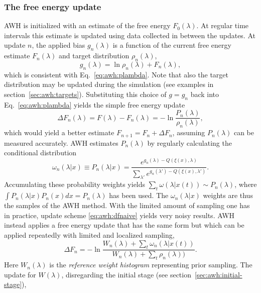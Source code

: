 \subsubsection{The free energy update}
AWH is initialized with an estimate of the free energy $F_0(\lambda)$.
At regular time intervals this estimate is updated using data collected in between the updates.
At update $n$, the applied bias $g_n(\lambda)$ is a function of the current free energy estimate $F_n(\lambda)$
and target distribution $\rho_n(\lambda)$,
\begin{equation}\label{eq:awh:grhofrelation}
g_n(\lambda) = \ln \rho_n(\lambda) +F_n(\lambda),
\end{equation}
which is consistent with Eq.~\ref{eq:awh:plambda}.
Note that also the target distribution may be updated during the simulation (see examples in section~\ref{sec:awh:targets}).
Substituting this choice of $g=g_n$ back into Eq.~\ref{eq:awh:plambda} yields the simple free energy update
\begin{equation}\label{eq:awh:dfnaive}
\Delta F_n(\lambda) 
= F(\lambda) - F_n(\lambda) 
= -\ln\frac{P_n(\lambda)}{\rho_n(\lambda)},
\end{equation}
which would yield a better estimate $F_{n+1} = F_n + \Delta F_n$, assuming $P_n(\lambda)$ can be measured accurately.
AWH estimates $P_n(\lambda)$ by regularly calculating the conditional distribution
\begin{equation}\label{eq:awh:omega}
\omega_n(\lambda|x) \equiv P_n(\lambda|x) = \frac{e^{g_n(\lambda) - Q(\xi(x), \lambda)}}{\sum_{\lambda'} e^{g_n(\lambda') - Q(\xi(x),\lambda')}}.
\end{equation}
Accumulating these probability weights yields
$\sum_t \omega(\lambda|x(t)) \sim P_n(\lambda)$,
where $\int P_n(\lambda|x) P_n(x) dx = P_n(\lambda)$ has been used.
The $\omega_n(\lambda|x)$ weights are thus the samples of the AWH method.
With the limited amount of sampling one has in practice, update scheme \ref{eq:awh:dfnaive} yields very noisy results.
AWH instead applies a free energy update that has the same form but which can be applied repeatedly with limited and localized sampling,
\begin{equation}
\Delta F_n = -\ln \frac{W_n(\lambda) + \sum_t \omega_n(\lambda|x(t))}{W_n(\lambda) + \sum_t\rho_n(\lambda)) }.
\end{equation}
Here $W_n(\lambda)$ is the \emph{reference weight histogram} representing prior sampling.
The update for $W(\lambda)$, disregarding the initial stage (see section~\ref{sec:awh:initial-stage}), 
